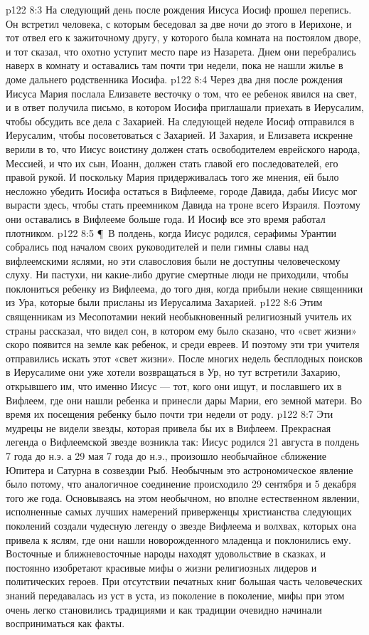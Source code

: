 \vs p122 8:3 На следующий день после рождения Иисуса Иосиф прошел перепись. Он встретил человека, с которым беседовал за две ночи до этого в Иерихоне, и тот отвел его к зажиточному другу, у которого была комната на постоялом дворе, и тот сказал, что охотно уступит место паре из Назарета. Днем они перебрались наверх в комнату и оставались там почти три недели, пока не нашли жилье в доме дальнего родственника Иосифа.
\vs p122 8:4 Через два дня после рождения Иисуса Мария послала Елизавете весточку о том, что ее ребенок явился на свет, и в ответ получила письмо, в котором Иосифа приглашали приехать в Иерусалим, чтобы обсудить все дела с Захарией. На следующей неделе Иосиф отправился в Иерусалим, чтобы посоветоваться с Захарией. И Захария, и Елизавета искренне верили в то, что Иисус воистину должен стать освободителем еврейского народа, Мессией, и что их сын, Иоанн, должен стать главой его последователей, его правой рукой. И поскольку Мария придерживалась того же мнения, ей было несложно убедить Иосифа остаться в Вифлееме, городе Давида, дабы Иисус мог вырасти здесь, чтобы стать преемником Давида на троне всего Израиля. Поэтому они оставались в Вифлееме больше года. И Иосиф все это время работал плотником.
\vs p122 8:5 \P\ В полдень, когда Иисус родился, серафимы Урантии собрались под началом своих руководителей и пели гимны славы над вифлеемскими яслями, но эти славословия были не доступны человеческому слуху. Ни пастухи, ни какие\hyp{}либо другие смертные люди не приходили, чтобы поклониться ребенку из Вифлеема, до того дня, когда прибыли некие священники из Ура, которые были присланы из Иерусалима Захарией.
\vs p122 8:6 Этим священникам из Месопотамии некий необыкновенный религиозный учитель их страны рассказал, что видел сон, в котором ему было сказано, что «свет жизни» скоро появится на земле как ребенок, и среди евреев. И поэтому эти три учителя отправились искать этот «свет жизни». После многих недель бесплодных поисков в Иерусалиме они уже хотели возвращаться в Ур, но тут встретили Захарию, открывшего им, что именно Иисус --- тот, кого они ищут, и пославшего их в Вифлеем, где они нашли ребенка и принесли дары Марии, его земной матери. Во время их посещения ребенку было почти три недели от роду.
\vs p122 8:7 Эти мудрецы не видели звезды, которая привела бы их в Вифлеем. Прекрасная легенда о Вифлеемской звезде возникла так: Иисус родился 21 августа в полдень 7 года до н.э. а 29 мая 7 года до н.э., произошло необычайное cближение Юпитера и Сатурна в созвездии Рыб. Необычным это астрономическое явление было потому, что аналогичное соединение происходило 29 сентября и 5 декабря того же года. Основываясь на этом необычном, но вполне естественном явлении, исполненные самых лучших намерений приверженцы христианства следующих поколений создали чудесную легенду о звезде Вифлеема и волхвах, которых она привела к яслям, где они нашли новорожденного младенца и поклонились ему. Восточные и ближневосточные народы находят удовольствие в сказках, и постоянно изобретают красивые мифы о жизни религиозных лидеров и политических героев. При отсутствии печатных книг большая часть человеческих знаний передавалась из уст в уста, из поколение в поколение, мифы при этом очень легко становились традициями и как традиции очевидно начинали восприниматься как факты.
